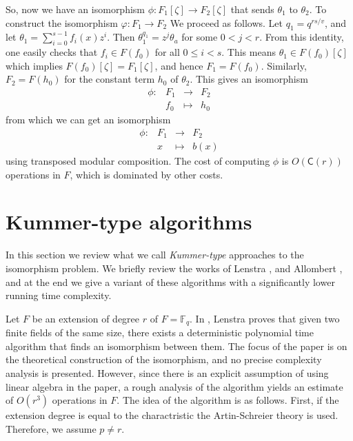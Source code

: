 \documentclass[12pt]{article}
\theoremstyle{plain}
\theoremstyle{definition}
\def\F{\ensuremath{\mathbb{F}}}
\def\CC{\ensuremath{\mathsf{C}}}
\newcounter{algorithm}
\begin{document}
So, now we have an isomorphism $\phi: F_1[\zeta] \rightarrow F_2[\zeta]$ that sends $\theta_1$ to  
$\theta_2$. To construct the isomorphism $\varphi: F_1 \rightarrow F_2$ We proceed as follows. Let 
$q_1 = q^{rs/v}$, and let $\theta_1 = \sum_{i = 0}^{s - 1}f_i(x)z^i$. Then $\theta_1^{q_1} = 
z^j\theta_a$ for some $0 < j < r$. From this identity, one easily checks that $f_i \in F(f_0)$ for 
all $0 \le i < s$. This means $\theta_1 \in F(f_0)[\zeta]$ which implies $F(f_0)[\zeta] = 
F_1[\zeta]$, and hence $F_1 = F(f_0)$. Similarly, $F_2 = F(h_0)$ for the constant term $h_0$ of 
$\theta_2$. This gives an isomorphism
\[
\begin{array}{rlll}
\phi: & F_1 & \longrightarrow & F_2 \\
& f_0 & \longmapsto & h_0
\end{array}
\]
from which we can get an isomorphism
\[
\begin{array}{rlll}
\phi: & F_1 & \longrightarrow & F_2 \\
& x & \longmapsto & b(x)
\end{array}
\]
using transposed modular composition. The cost of computing $\phi$ is $O(\CC(r))$ operations in 
$F$, which is dominated by other costs.




\section{Kummer-type algorithms}
\label{sec:kummer}

In this section we review what we call \textit{Kummer-type} approaches to the isomorphism problem. 
We briefly review the works of Lenstra \cite{LenstraJr91}, and Allombert \cite{Allombert02}, and at 
the end we give a variant of these algorithms with a significantly lower running time complexity.

Let $F$ be an extension of degree $r$ of $F = \F_q$. In \cite{LenstraJr91}, Lenstra proves that 
given two finite fields of the same size, there exists a deterministic polynomial time algorithm 
that finds an isomorphism between them. The focus of the paper is on the theoretical construction 
of the isomorphism, and no precise complexity analysis is presented. However, since there is an 
explicit assumption of using linear algebra in the paper, a rough analysis of the algorithm yields 
an estimate of $O(r^3)$ operations in $F$. The idea of the algorithm is as follows. First, if 
the extension degree is equal to the charactristic the Artin-Schreier theory is used. Therefore, we 
assume $p \ne r$.
\end{document}
